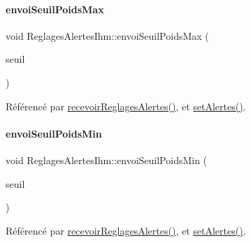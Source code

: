 \paragraph{\texorpdfstring{envoi\+Seuil\+Poids\+Max}{envoiSeuilPoidsMax}}
{\footnotesize\ttfamily void Reglages\+Alertes\+Ihm\+::envoi\+Seuil\+Poids\+Max (\begin{DoxyParamCaption}\item[{Q\+String}]{seuil }\end{DoxyParamCaption})\hspace{0.3cm}{\ttfamily [signal]}}



Référencé par \hyperlink{class_reglages_alertes_ihm_a5c40f718b28b948a90574ef0c2d3e587}{recevoir\+Reglages\+Alertes()}, et \hyperlink{class_reglages_alertes_ihm_aeb0331a6103f944cb15cdd62985ca231}{set\+Alertes()}.

\mbox{\label{class_reglages_alertes_ihm_a6d4642c0f64bad9f070ce7988549f8df}} 
\paragraph{\texorpdfstring{envoi\+Seuil\+Poids\+Min}{envoiSeuilPoidsMin}}
{\footnotesize\ttfamily void Reglages\+Alertes\+Ihm\+::envoi\+Seuil\+Poids\+Min (\begin{DoxyParamCaption}\item[{Q\+String}]{seuil }\end{DoxyParamCaption})\hspace{0.3cm}{\ttfamily [signal]}}



Référencé par \hyperlink{class_reglages_alertes_ihm_a5c40f718b28b948a90574ef0c2d3e587}{recevoir\+Reglages\+Alertes()}, et \hyperlink{class_reglages_alertes_ihm_aeb0331a6103f944cb15cdd62985ca231}{set\+Alertes()}.

\mbox{\label{class_reglages_alertes_ihm_a78ea60b683ff8bde49d8bd332eb71c57}} 
